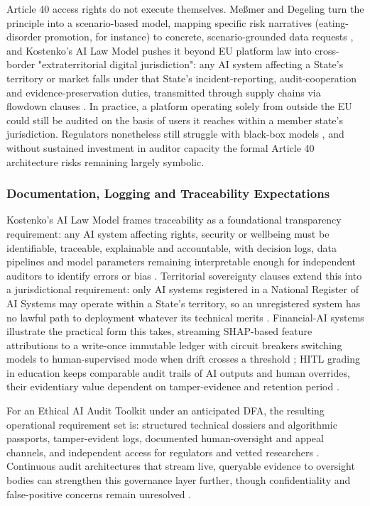 \documentclass[11pt]{article}
\begin{document}
Article 40 access rights do not execute themselves. Me{\ss}mer and Degeling turn the principle into a scenario-based model, mapping specific risk narratives (eating-disorder promotion, for instance) to concrete, scenario-grounded data requests \parencites[15]{3195574}, and Kostenko's AI Law Model pushes it beyond EU platform law into cross-border "extraterritorial digital jurisdiction": any AI system affecting a State's territory or market falls under that State's incident-reporting, audit-cooperation and evidence-preservation duties, transmitted through supply chains via flowdown clauses \parencites[249]{2977039}. In practice, a platform operating solely from outside the EU could still be audited on the basis of users it reaches within a member state's jurisdiction. Regulators nonetheless still struggle with black-box models \parencites[9]{7461574}, and without sustained investment in auditor capacity the formal Article 40 architecture risks remaining largely symbolic.

\subsubsection{Documentation, Logging and Traceability Expectations}
\label{sec:doc_logging_traceability} Kostenko's AI Law Model frames traceability as a foundational transparency requirement: any AI system affecting rights, security or wellbeing must be identifiable, traceable, explainable and accountable, with decision logs, data pipelines and model parameters remaining interpretable enough for independent auditors to identify errors or bias \parencites[35]{2977039}[36]{2977039}. Territorial sovereignty clauses extend this into a jurisdictional requirement: only AI systems registered in a National Register of AI Systems may operate within a State's territory, so an unregistered system has no lawful path to deployment whatever its technical merits \parencites[124]{2977039}. Financial-AI systems illustrate the practical form this takes, streaming SHAP-based feature attributions to a write-once immutable ledger with circuit breakers switching models to human-supervised mode when drift crosses a threshold \parencites[7]{8907572}; HITL grading in education keeps comparable audit trails of AI outputs and human overrides, their evidentiary value dependent on tamper-evidence and retention period \parencites[15]{6805789}.

For an Ethical AI Audit Toolkit under an anticipated DFA, the resulting operational requirement set is: structured technical dossiers and algorithmic passports, tamper-evident logs, documented human-oversight and appeal channels, and independent access for regulators and vetted researchers \parencites[9]{7461574}[12]{6502223}. Continuous audit architectures that stream live, queryable evidence to oversight bodies can strengthen this governance layer further, though confidentiality and false-positive concerns remain unresolved \parencites[2]{4639902}[10]{7504644}.
\end{document}
